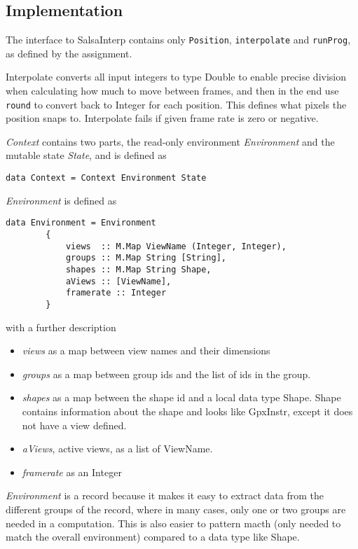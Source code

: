 \documentclass[a4paper, 10pt]{article}
\begin{document}
\subsection{Implementation}
The interface to SalsaInterp contains only \texttt{Position}, \texttt{interpolate} and \texttt{runProg}, as defined by the assignment.

Interpolate converts all input integers to type Double to enable precise division when calculating how much to move between frames, and then in the end use \texttt{round} to convert back to Integer for each position. This defines what pixels the position snaps to. Interpolate fails if given frame rate is zero or negative.

\textit{Context} contains two parts, the read-only environment \textit{Environment} and the mutable state \textit{State}, and is defined as
\begin{verbatim}
data Context = Context Environment State
\end{verbatim}

\textit{Environment} is defined as
\begin{verbatim}
data Environment = Environment 
        {
            views  :: M.Map ViewName (Integer, Integer),
            groups :: M.Map String [String],
            shapes :: M.Map String Shape,
            aViews :: [ViewName],
            framerate :: Integer
        }
\end{verbatim}
with a further description
\begin{itemize}
  \item \textit{views} as a map between view names and their dimensions
  \item \textit{groups} as a map between group ids and the list of ids in the group.
  \item \textit{shapes} as a map between the shape id and a local data type Shape. Shape contains information about the shape and looks like GpxInstr, except it does not have a view defined.
  \item \textit{aViews}, active views, as a list of ViewName.
  \item \textit{framerate} as an Integer
\end{itemize}
\textit{Environment} is a record because it makes it easy to extract data from the different groups of the record, where in many cases, only one or two groups are needed in a computation. This is also easier to pattern macth (only needed to match the overall environment) compared to a data type like Shape.
\end{document}
